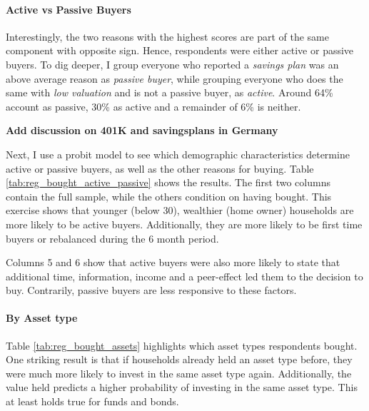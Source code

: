 \documentclass[ProjectABM]{subfiles}
\begin{document}



\paragraph{Active vs Passive Buyers}
Interestingly, the two reasons with the highest scores are part of the same component with opposite sign. Hence, respondents were either active or passive buyers. To dig deeper, I group everyone who reported a \textit{savings plan} was an above average reason as \textit{passive buyer}, while grouping everyone who does the same with \textit{low valuation} and is not a passive buyer, as \textit{active}. Around 64\% account as passive, 30\% as active and a remainder of 6\% is neither.

\textbf{Add discussion on 401K and savingsplans in Germany}

Next, I use a probit model to see which demographic characteristics determine active or passive buyers, as well as the other reasons for buying. Table \ref{tab:reg_bought_active_passive} shows the results. The first two columns contain the full sample, while the others condition on having bought. This exercise shows that younger (below 30), wealthier (home owner) households are more likely to be active buyers. Additionally, they are more likely to be first time buyers or rebalanced during the 6 month period.

Columns 5 and 6 show that active buyers were also more likely to state that additional time, information, income and a peer-effect led them to the decision to buy. Contrarily, passive buyers are less responsive to these factors.




\paragraph{By Asset type}
Table \ref{tab:reg_bought_assets} highlights which asset types respondents bought. One striking result is that if households already held an asset type before, they were much more likely to invest in the same asset type again. Additionally, the value held predicts a higher probability of investing in the same asset type. This at least holds true for funds and bonds. %
\end{document}
